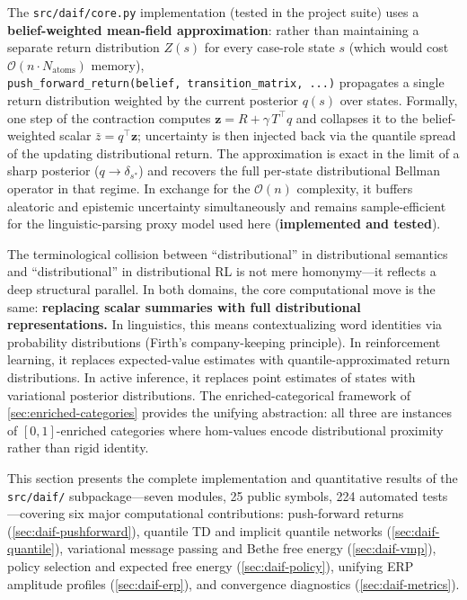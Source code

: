 \documentclass[
]{article}
\begin{document}
The \texttt{src/daif/core.py} implementation (tested in the project
suite) uses a \textbf{belief-weighted mean-field approximation}: rather
than maintaining a separate return distribution \(Z(s)\) for every
case-role state \(s\) (which would cost
\(\mathcal{O}(n \cdot N_{\text{atoms}})\) memory),
\texttt{push\_forward\_return(belief,\ transition\_matrix,\ ...)}
propagates a single return distribution weighted by the current
posterior \(q(s)\) over states. Formally, one step of the contraction
computes \(\mathbf{z} = R + \gamma\, T^{\top} q\) and collapses it to
the belief-weighted scalar \(\bar z = q^{\top} \mathbf{z}\); uncertainty
is then injected back via the quantile spread of the updating
distributional return. The approximation is exact in the limit of a
sharp posterior (\(q \to \delta_{s^\ast}\)) and recovers the full
per-state distributional Bellman operator in that regime. In exchange
for the \(\mathcal{O}(n)\) complexity, it buffers aleatoric and
epistemic uncertainty simultaneously and remains sample-efficient for
the linguistic-parsing proxy model used here (\textbf{implemented and
tested}).

The terminological collision between ``distributional'' in
distributional semantics and ``distributional'' in distributional RL is
not mere homonymy---it reflects a deep structural parallel. In both
domains, the core computational move is the same: \textbf{replacing
scalar summaries with full distributional representations.} In
linguistics, this means contextualizing word identities via probability
distributions (Firth's \citeyearpar{firth1957papers} company-keeping
principle). In reinforcement learning, it replaces expected-value
estimates with quantile-approximated return distributions. In active
inference, it replaces point estimates of states with variational
posterior distributions. The enriched-categorical framework of
\autoref{sec:enriched-categories} provides the unifying abstraction: all
three are instances of \([0,1]\)-enriched categories where hom-values
encode distributional proximity rather than rigid identity.

This section presents the complete implementation and quantitative
results of the \texttt{src/daif/} subpackage---seven modules, 25 public
symbols, 224 automated tests---covering six major computational
contributions: push-forward returns (\autoref{sec:daif-pushforward}),
quantile TD and implicit quantile networks
(\autoref{sec:daif-quantile}), variational message passing and Bethe
free energy (\autoref{sec:daif-vmp}), policy selection and expected free
energy (\autoref{sec:daif-policy}), unifying ERP amplitude profiles
(\autoref{sec:daif-erp}), and convergence diagnostics
(\autoref{sec:daif-metrics}).
\end{document}
